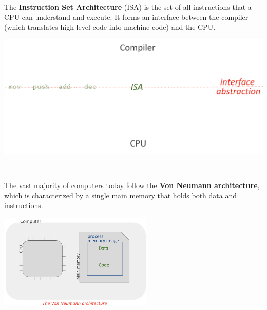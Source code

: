 \begin{minipage}{0.45\textwidth}
\begin{definition}[ISA]
The \textbf{Instruction Set Architecture} (ISA) is the set of all instructions that a CPU can understand and execute. It forms an interface between the compiler (which translates high-level code into machine code) and the CPU.
\end{definition}
\end{minipage}
\hfill
\vline
\hfill
\begin{minipage}{0.45\textwidth}
\begin{center}
  \includegraphics[width=1.25\textwidth]{chapters/L1/images/isa.png}
\end{center}
\end{minipage}\\
\vfill
\begin{definition}
The vast majority of computers today follow the \textbf{Von Neumann architecture}, which is characterized by a single main memory that holds both data and instructions.

\begin{center}
  \includegraphics[width=0.55\textwidth]{chapters/L1/images/von.png}
\end{center}
\end{definition}

